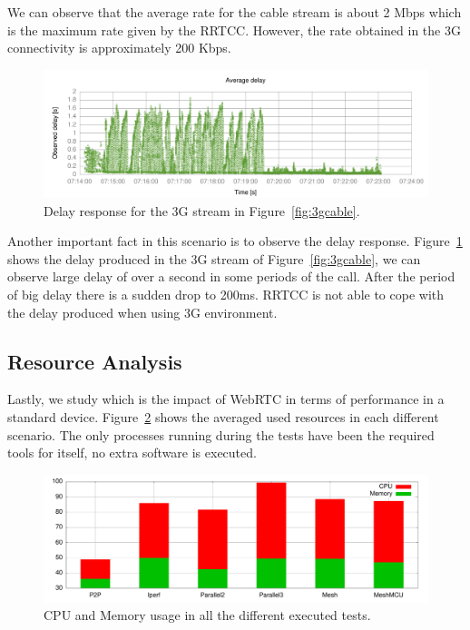 We can observe that the average rate for the cable stream is about 2 Mbps which is the maximum rate given by the RRTCC. However, the rate obtained in the 3G connectivity is approximately 200 Kbps. 

\begin{figure}[h]
  \centering
    \includegraphics[width=1\textwidth]{./figures/delay_3g.pdf}
      \caption[Delay response for the 3G stream in Figure~\ref{fig:3gcable}]{Delay response for the 3G stream in Figure~\ref{fig:3gcable}.}
	\label{fig:3gcable_delay}
\end{figure}

Another important fact in this scenario is to observe the delay response. Figure~\ref{fig:3gcable_delay} shows the delay produced in the 3G stream of Figure~\ref{fig:3gcable}, we can observe large delay of over a second in some periods of the call. After the period of big delay there is a sudden drop to 200ms. RRTCC is not able to cope with the delay produced when using 3G environment.

\subsection{Resource Analysis}

Lastly, we study which is the impact of WebRTC in terms of performance in a standard device. Figure~\ref{fig:global_tests} shows the averaged used resources in each different scenario. The only processes running during the tests have been the required tools for itself, no extra software is executed.

\begin{figure}[h]
  \centering
    \includegraphics[width=1\textwidth]{./figures/perf.pdf}
      \caption[CPU and Memory usage in all the different executed tests]{CPU and Memory usage in all the different executed tests.}
	\label{fig:global_tests}
\end{figure}

